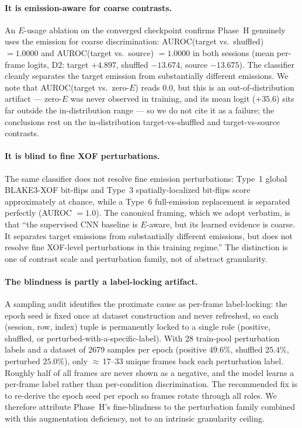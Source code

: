 \paragraph{It is emission-aware for coarse contrasts.}
An $E$-usage ablation on the converged checkpoint confirms Phase~H genuinely uses the emission for coarse discrimination: AUROC(target vs.\ shuffled) $=1.0000$ and AUROC(target vs.\ source) $=1.0000$ in both sessions (mean per-frame logits, D2: target $+4.897$, shuffled $-13.674$, source $-13.675$). The classifier cleanly separates the target emission from substantially different emissions. We note that AUROC(target vs.\ zero-$E$) reads $0.0$, but this is an out-of-distribution artifact --- zero-$E$ was never observed in training, and its mean logit ($+35.6$) sits far outside the in-distribution range --- so we do not cite it as a failure; the conclusions rest on the in-distribution target-vs-shuffled and target-vs-source contrasts.

\paragraph{It is blind to fine XOF perturbations.}
The same classifier does not resolve fine emission perturbations: Type~1 global BLAKE3-XOF bit-flips and Type~3 spatially-localized bit-flips score approximately at chance, while a Type~6 full-emission replacement is separated perfectly (AUROC $=1.0$). The canonical framing, which we adopt verbatim, is that ``the supervised CNN baseline is $E$-aware, but its learned evidence is coarse. It separates target emissions from substantially different emissions, but does not resolve fine XOF-level perturbations in this training regime.'' The distinction is one of contrast scale and perturbation family, not of abstract granularity.

\paragraph{The blindness is partly a label-locking artifact.}
A sampling audit identifies the proximate cause as per-frame label-locking: the epoch seed is fixed once at dataset construction and never refreshed, so each (session, row, index) tuple is permanently locked to a single role (positive, shuffled, or perturbed-with-a-specific-label). With 28 train-pool perturbation labels and a dataset of \num{2679} samples per epoch (positive $49.6\%$, shuffled $25.4\%$, perturbed $25.0\%$), only $\approx$\,17--33 unique frames back each perturbation label. Roughly half of all frames are never shown as a negative, and the model learns a per-frame label rather than per-condition discrimination. The recommended fix is to re-derive the epoch seed per epoch so frames rotate through all roles. We therefore attribute Phase~H's fine-blindness to the perturbation family combined with this augmentation deficiency, not to an intrinsic granularity ceiling.

